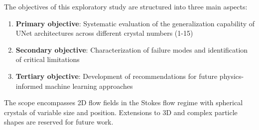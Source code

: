 The objectives of this exploratory study are structured into three main aspects:

\begin{enumerate}
    \item \textbf{Primary objective}: Systematic evaluation of the generalization capability of UNet architectures across different crystal numbers (1-15)
    \item \textbf{Secondary objective}: Characterization of failure modes and identification of critical limitations
    \item \textbf{Tertiary objective}: Development of recommendations for future physics-informed machine learning approaches
\end{enumerate}

The scope encompasses 2D flow fields in the Stokes flow regime with spherical crystals of variable size and position. Extensions to 3D and complex particle shapes are reserved for future work.